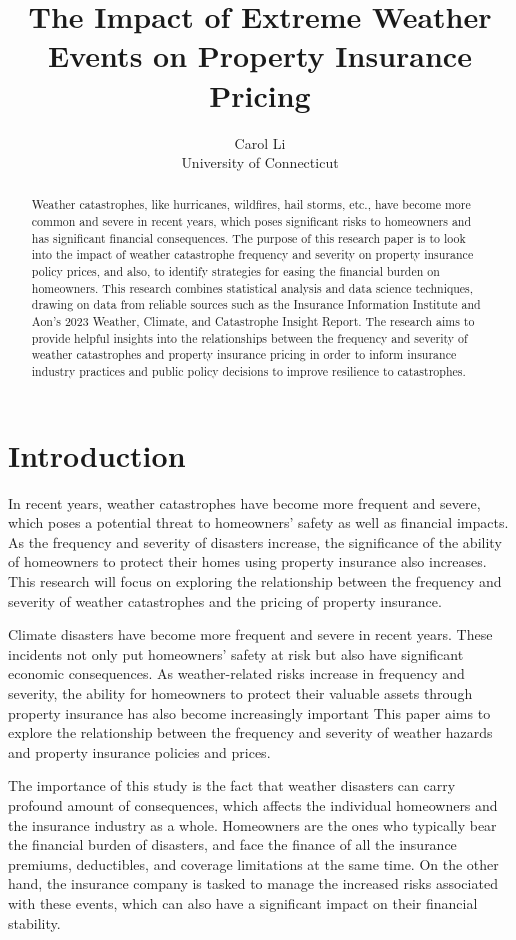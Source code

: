 \documentclass[12pt]{article}
\title{The Impact of Extreme Weather Events on Property Insurance Pricing}
\author{Carol Li\\
    University of Connecticut
}
\begin{document}
\maketitle

\begin{abstract}
Weather catastrophes, like hurricanes, wildfires, hail storms, etc., have become more common and severe in recent years, which poses 
significant risks to homeowners and has significant financial consequences. The purpose of this research paper is to look into the 
impact of weather catastrophe frequency and severity on property insurance policy prices, and also, to identify strategies for easing 
the financial burden on homeowners. This research combines statistical analysis and data science techniques, drawing on data from 
reliable sources such as the Insurance Information Institute and Aon's 2023 Weather, Climate, and Catastrophe Insight Report. The 
research aims to provide helpful insights into the relationships between the frequency and severity of weather catastrophes and 
property insurance pricing in order to inform insurance industry practices and public policy decisions to improve resilience to 
catastrophes.
\end{abstract}


\section{Introduction}
\label{sec:intro}
In recent years, weather catastrophes have become more frequent and severe, which poses a potential threat to homeowners' safety as 
well as financial impacts. As the frequency and severity of disasters increase, the significance of the ability of homeowners to 
protect their homes using property insurance also increases. This research will focus on exploring the relationship between the 
frequency and severity of weather catastrophes and the pricing of property insurance.

Climate disasters have become more frequent and severe in recent years. These incidents not only put homeowners' safety at risk but 
also have significant economic consequences. As weather-related risks increase in frequency and severity, the ability for homeowners to 
protect their valuable assets through property insurance has also become increasingly important This paper aims to explore the 
relationship between the frequency and severity of weather hazards and property insurance policies and prices.

The importance of this study is the fact that weather disasters can carry profound amount of consequences, which affects the individual 
homeowners and the insurance industry as a whole. Homeowners are the ones who typically bear the financial burden of disasters, and face 
the finance of all the insurance premiums, deductibles, and coverage limitations at the same time. On the other hand, the insurance 
company is tasked to manage the increased risks associated with these events, which can also have a significant impact on their financial 
stability.
\end{document}
